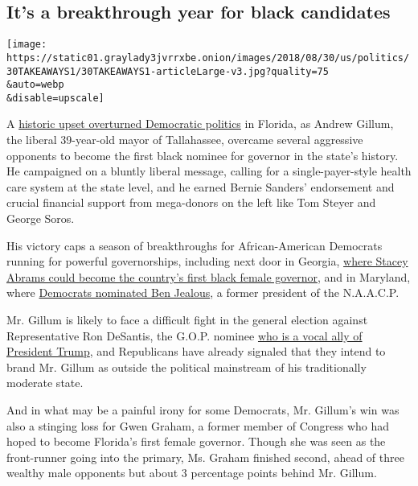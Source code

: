 \hypertarget{its-a-breakthrough-year-for-black-candidates}{%
\subsection{It's a breakthrough year for black
candidates}\label{its-a-breakthrough-year-for-black-candidates}}

\texttt{[image: https://static01.graylady3jvrrxbe.onion/images/2018/08/30/us/politics/30TAKEAWAYS1/30TAKEAWAYS1-articleLarge-v3.jpg?quality=75\\\&auto=webp\\\&disable=upscale]}

A
\href{https://www.nytimes3xbfgragh.onion/2018/08/28/us/politics/florida-arizona-election-results.html}{historic
upset overturned Democratic politics} in Florida, as Andrew Gillum, the
liberal 39-year-old mayor of Tallahassee, overcame several aggressive
opponents to become the first black nominee for governor in the state's
history. He campaigned on a bluntly liberal message, calling for a
single-payer-style health care system at the state level, and he earned
Bernie Sanders' endorsement and crucial financial support from
mega-donors on the left like Tom Steyer and George Soros.

His victory caps a season of breakthroughs for African-American
Democrats running for powerful governorships, including next door in
Georgia,
\href{https://www.nytimes3xbfgragh.onion/2018/08/19/us/politics/stacey-abrams-georgia.html}{where
Stacey Abrams could become the country's first black female governor},
and in Maryland, where
\href{https://www.nytimes3xbfgragh.onion/2018/06/27/us/politics/ben-jealous-maryland-governor.html}{Democrats
nominated Ben Jealous}, a former president of the N.A.A.C.P.

Mr. Gillum is likely to face a difficult fight in the general election
against Representative Ron DeSantis, the G.O.P. nominee
\href{https://www.nytimes3xbfgragh.onion/2018/07/30/us/politics/florida-governor-election.html}{who
is a vocal ally of President Trump}, and Republicans have already
signaled that they intend to brand Mr. Gillum as outside the political
mainstream of his traditionally moderate state.

And in what may be a painful irony for some Democrats, Mr. Gillum's win
was also a stinging loss for Gwen Graham, a former member of Congress
who had hoped to become Florida's first female governor. Though she was
seen as the front-runner going into the primary, Ms. Graham finished
second, ahead of three wealthy male opponents but about 3 percentage
points behind Mr. Gillum.

